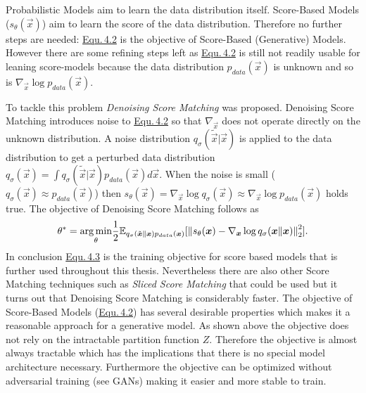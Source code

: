 Probabilistic Models aim to learn the data distribution itself. Score-Based Models ($s_\theta(\vec{x})$) aim to learn the score of the data distribution. Therefore no further steps are needed: \hyperref[equ:4.2]{Equ.\,4.2} is the objective of Score-Based (Generative) Models. However there are some refining steps left as \hyperref[equ:4.2]{Equ.\,4.2} is still not readily usable for leaning score-models because the data distribution $p_{data}(\vec{x})$ is unknown and so is $\nabla_{\vec{x}}\log p_{data}(\vec{x})$. 

%
%
To tackle this problem \textit{Denoising Score Matching} \cite{denoise_score} was proposed. Denoising Score Matching introduces noise to \hyperref[equ:4.2]{Equ.\,4.2} so that $\nabla_{\vec{x}}$ does not operate directly on the unknown distribution. A noise distribution $q_\sigma(\tilde{\vec{x}}|\vec{x})$ is applied to the data distribution to get a perturbed data distribution $q_\sigma(\vec{x})=\int q_\sigma(\tilde{\vec{x}}|\vec{x})p_{data}(\vec{x})d\vec{x}$. When the noise is small ($q_\sigma(\vec{x})\approx p_{data}(\vec{x})$) then $s_\theta(\vec{x})=\nabla_{\vec{x}}\log q_\sigma(\vec{x})\approx\nabla_{\vec{x}}\log p_{data}(\vec{x})$ holds true. The objective of Denoising Score Matching follows as
%
\begin{equation} \label{equ:4.3}
    \theta^*=\underset{\theta}{\arg\min}\frac{1}{2}\mathbb{E}_{q_\sigma(\tilde{\boldsymbol{x}}\lVert\boldsymbol{x})p_{data}(\boldsymbol{x})}[\left\lVert s_\theta(\boldsymbol{x})-\nabla_{\boldsymbol{x}}\log q_\sigma(\boldsymbol{x}\lVert\boldsymbol{x})\right\rVert^2_2].
\end{equation}
%
In conclusion \hyperref[equ:4.3]{Equ.\,4.3} is the training objective for score based models that is further used throughout this thesis. Nevertheless there are also other Score Matching techniques such as \textit{Sliced Score Matching} \cite{song2019sliced} that could be used but it turns out that Denoising Score Matching is considerably faster. The objective of Score-Based Models (\hyperref[equ:4.2]{Equ.\,4.2}) has several desirable properties which makes it a reasonable approach for a generative model. As shown above the objective does not rely on the intractable partition function $Z$. Therefore the objective is almost always tractable which has the implications that there is no special model architecture necessary. Furthermore the objective can be optimized without adversarial training (see GANs) making it easier and more stable to train. %

